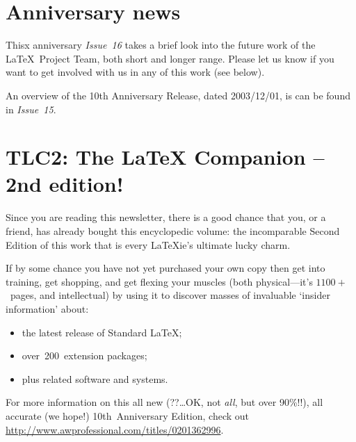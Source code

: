 \documentclass{ltnews}
\begin{document}
\maketitle


\section{Anniversary news}

Thisx anniversary \textit{Issue~16} takes a brief look into the future work of
the \LaTeX\ Project Team, both short and longer range.  Please let
us know if you want %
to get involved with us in any of this work (see below).

An overview of the 10th Anniversary Release, dated 2003/12/01, is
can be found in \textit{Issue~15}.


\section{TLC2: The \LaTeX{} Companion -- 2nd edition!}

Since you are reading this newsletter, there is a good chance that
you, or a friend, has already bought this encyclopedic volume: the
incomparable Second\newline
Edition of this work that is every \LaTeX{}ie's\newline
ultimate lucky charm.

If by some chance you have not yet purchased your own copy then get
into training, get shopping, and get flexing your muscles (both
physical---it's $1100+$~pages,\newline
and intellectual) by using it to discover
masses of invaluable `insider information' about:
\begin{itemize}
\item the latest release of Standard \LaTeX{};
\item over~200~extension packages;
\item plus related software and systems.
\end{itemize}
For more information on this all new (??\ldots OK,\newline
not \emph{all}, but over 90\%!!),
all accurate (we hope!)\newline
10th~Anniversary Edition, check out\newline
 \mbox{\url{http://www.awprofessional.com/titles/0201362996}}.
\end{document}
